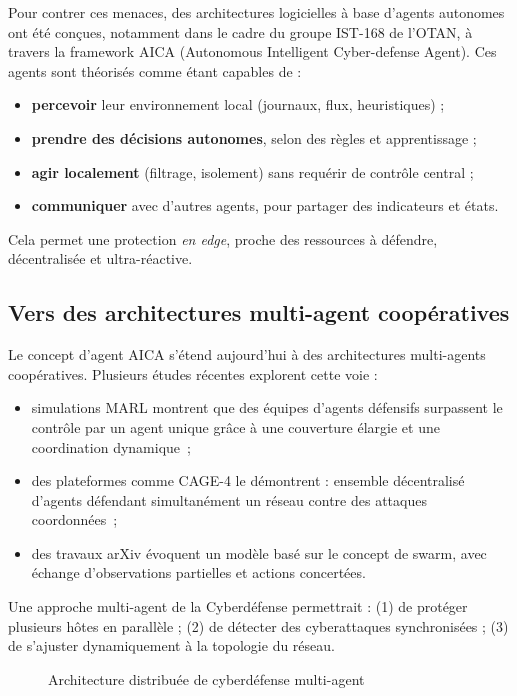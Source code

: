\documentclass[ twoside,openright,titlepage,numbers=noenddot,headinclude,%
                footinclude=true,cleardoublepage=empty,abstractoff, %
                BCOR=5mm,paper=a4,fontsize=11pt,%
                french,american,%
                ]{scrreprt}
\begin{document}
Pour contrer ces menaces, des architectures logicielles à base d'agents autonomes ont été conçues, notamment dans le cadre du groupe IST-168 de l'OTAN, à travers la framework AICA (Autonomous Intelligent Cyber-defense Agent). Ces agents sont théorisés comme étant capables de :
\begin{itemize}
    \item \textbf{percevoir} leur environnement local (journaux, flux, heuristiques) ;
    \item \textbf{prendre des décisions autonomes}, selon des règles et apprentissage ;
    \item \textbf{agir localement} (filtrage, isolement) sans requérir de contrôle central ;
    \item \textbf{communiquer} avec d'autres agents, pour partager des indicateurs et états.
\end{itemize}
Cela permet une protection {\em en edge}, proche des ressources à défendre, décentralisée et ultra-réactive.

\subsection*{Vers des architectures multi-agent coopératives}

Le concept d'agent AICA s'étend aujourd'hui à des architectures multi-agents coopératives. Plusieurs études récentes explorent cette voie :
\begin{itemize}
    \item simulations MARL montrent que des équipes d'agents défensifs surpassent le contrôle par un agent unique grâce à une couverture élargie et une coordination dynamique~\cite{RLResilientCyberdefense2024};
    \item des plateformes comme CAGE-4 le démontrent : ensemble décentralisé d'agents défendant simultanément un réseau contre des attaques coordonnées~\cite{cage_challenge_3_announcement};
    \item des travaux arXiv évoquent un modèle basé sur le concept de swarm, avec échange d'observations partielles et actions concertées.
\end{itemize}
Une approche multi-agent de la Cyberdéfense permettrait : (1) de protéger plusieurs hôtes en parallèle ; (2) de détecter des cyberattaques synchronisées ; (3) de s'ajuster dynamiquement à la topologie du réseau.

\begin{figure}[h]
    \centering
    \caption{Architecture distribuée de cyberdéfense multi-agent}
    \label{fig:distributed_sma}
\end{figure}
\end{document}
